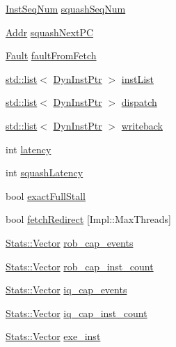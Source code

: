 \begin{DoxyCompactItemize}
\hyperlink{inst__seq_8hh_a258d93d98edaedee089435c19ea2ea2e}{InstSeqNum} \hyperlink{classBackEnd_a34292b1418c46ca63c892e7826510d77}{squashSeqNum}
\item 
\hyperlink{base_2types_8hh_af1bb03d6a4ee096394a6749f0a169232}{Addr} \hyperlink{classBackEnd_aabe0c73b4678ef858d3363c9bed18906}{squashNextPC}
\item 
\hyperlink{classRefCountingPtr}{Fault} \hyperlink{classBackEnd_a21a86a2f5f30b0f512909bdc8b2aae53}{faultFromFetch}
\item 
\hyperlink{classstd_1_1list}{std::list}$<$ \hyperlink{classBackEnd_a028ce10889c5f6450239d9e9a7347976}{DynInstPtr} $>$ \hyperlink{classBackEnd_ae10a391d02ce1ef67ee13cd82b7d46e5}{instList}
\item 
\hyperlink{classstd_1_1list}{std::list}$<$ \hyperlink{classBackEnd_a028ce10889c5f6450239d9e9a7347976}{DynInstPtr} $>$ \hyperlink{classBackEnd_a1e13c801cafc8d7e052b2f999c89ad85}{dispatch}
\item 
\hyperlink{classstd_1_1list}{std::list}$<$ \hyperlink{classBackEnd_a028ce10889c5f6450239d9e9a7347976}{DynInstPtr} $>$ \hyperlink{classBackEnd_ae4b76f4612be07d13b349e13ee9dfa16}{writeback}
\item 
int \hyperlink{classBackEnd_a9c5bf07170b5d91cfb44d4bfd0517128}{latency}
\item 
int \hyperlink{classBackEnd_a440f8cda1481977c324a827c7c9f1e24}{squashLatency}
\item 
bool \hyperlink{classBackEnd_a319e9530b28153883e886be5b9c573eb}{exactFullStall}
\item 
bool \hyperlink{classBackEnd_aa40219506ff80e4e8c5a9a3b1205b282}{fetchRedirect} \mbox{[}Impl::MaxThreads\mbox{]}
\item 
\hyperlink{classStats_1_1Vector}{Stats::Vector} \hyperlink{classBackEnd_a6480145c05acc370598e816e2e8cf879}{rob\_\-cap\_\-events}
\item 
\hyperlink{classStats_1_1Vector}{Stats::Vector} \hyperlink{classBackEnd_a0eb2b00bb6b4dfa3e98d7a3c5c425c50}{rob\_\-cap\_\-inst\_\-count}
\item 
\hyperlink{classStats_1_1Vector}{Stats::Vector} \hyperlink{classBackEnd_a94526617722efa24b56a33ac2e91a53d}{iq\_\-cap\_\-events}
\item 
\hyperlink{classStats_1_1Vector}{Stats::Vector} \hyperlink{classBackEnd_ab013e91b819cbfbaeb30f620eeb9af63}{iq\_\-cap\_\-inst\_\-count}
\item 
\hyperlink{classStats_1_1Vector}{Stats::Vector} \hyperlink{classBackEnd_afdd7841e13784687ccb7c432189dca2f}{exe\_\-inst}

\end{DoxyCompactItemize}
